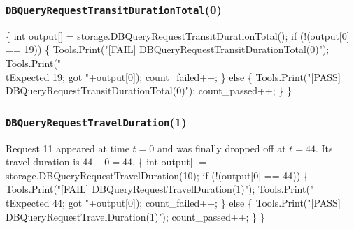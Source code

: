 \documentclass{article}
\def\nwendcode{\endtrivlist \endgroup}
\let\nwdocspar=\par
\begin{document}
\subsubsection{{\tt{}DBQueryRequestTransitDurationTotal}(0)}
\nwenddocs{}\endmoddef{}
\{
  int output[] = storage.DBQueryRequestTransitDurationTotal();
  if (!(output[0] == 19)) \{
    Tools.Print("[FAIL] DBQueryRequestTransitDurationTotal(0)");
    Tools.Print("\\tExpected 19; got "+output[0]);
    count_failed++;
  \} else \{
    Tools.Print("[PASS] DBQueryRequestTransitDurationTotal(0)");
    count_passed++;
  \}
\}
\nwendcode{}\nwdocspar
\subsubsection{{\tt{}DBQueryRequestTravelDuration}(1)}
Request 11 appeared at time $t=0$ and was finally dropped off at $t=44$. Its
travel duration is $44-0=44$.
\nwenddocs{}\endmoddef{}
\{
  int output[] = storage.DBQueryRequestTravelDuration(10);
  if (!(output[0] == 44)) \{
    Tools.Print("[FAIL] DBQueryRequestTravelDuration(1)");
    Tools.Print("\\tExpected 44; got "+output[0]);
    count_failed++;
  \} else \{
    Tools.Print("[PASS] DBQueryRequestTravelDuration(1)");
    count_passed++;
  \}
\}
\nwendcode{}\nwdocspar
\end{document}
